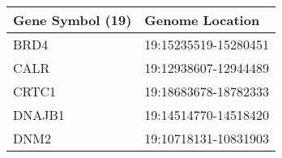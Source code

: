 \begin{tabular}{ll}
\toprule
Gene Symbol (19) &      Genome Location \\
\midrule
            BRD4 & 19:15235519-15280451 \\
            CALR & 19:12938607-12944489 \\
           CRTC1 & 19:18683678-18782333 \\
          DNAJB1 & 19:14514770-14518420 \\
            DNM2 & 19:10718131-10831903 \\
\bottomrule
\end{tabular}
